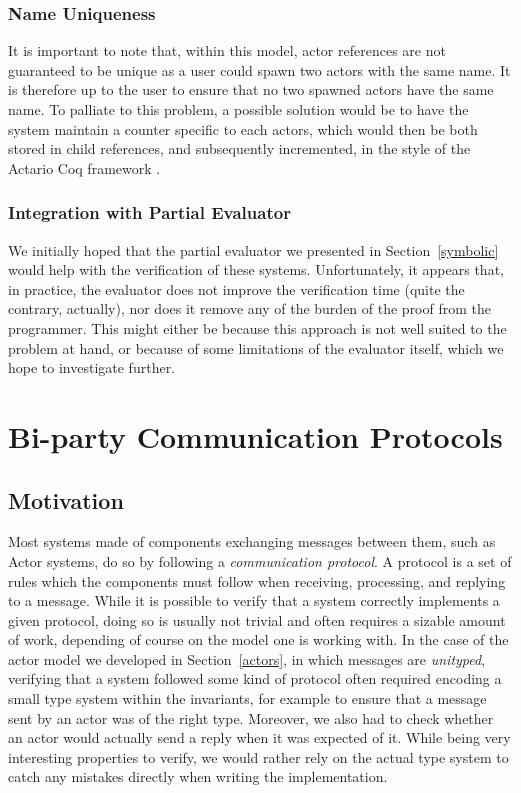 \documentclass[a4paper,twoside]{article}
\newcommand{\RefSec}[1]{Section~\ref{#1}}
\begin{document}
\subsubsection*{Name Uniqueness}

It is important to note that, within this model, actor references are not guaranteed to be unique as a user could spawn two actors with the same name. It is therefore up to the user to ensure that no two spawned actors have the same name. To palliate to this problem, a possible solution would be to have the system maintain a counter specific to each actors, which would then be both stored in child references, and subsequently incremented, in the style of the Actario Coq framework \cite{actario}.

\subsubsection*{Integration with Partial Evaluator}

We initially hoped that the partial evaluator we presented in \RefSec{symbolic} would help with the verification of these systems. Unfortunately, it appears that, in practice, the evaluator does not improve the verification time (quite the contrary, actually), nor does it remove any of the burden of the proof from the programmer. This might either be because this approach is not well suited to the problem at hand, or because of some limitations of the evaluator itself, which we hope to investigate further.

\clearpage
\section{Bi-party Communication Protocols}
\label{biparty}

\subsection{Motivation}
\label{sess-mot}

Most systems made of components exchanging messages between them, such as Actor systems, do so by following a \textit{communication protocol}. A protocol is a set of rules which the components must follow when receiving, processing, and replying to a message. While it is possible to verify that a system correctly implements a given protocol, doing so is usually not trivial and often requires a sizable amount of work, depending of course on the model one is working with. In the case of the actor model we developed in \RefSec{actors}, in which messages are \textit{unityped}, verifying that a system followed some kind of protocol often required encoding a small type system within the invariants, for example to ensure that a message sent by an actor was of the right type. Moreover, we also had to check whether an actor would actually send a reply when it was expected of it. While being very interesting properties to verify, we would rather rely on the actual type system to catch any mistakes directly when writing the implementation.
\end{document}
